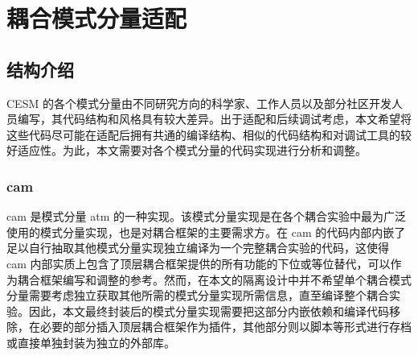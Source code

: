 \chapter{耦合模式分量适配}
\label{cha:refactor}

\section{结构介绍}

CESM 的各个模式分量由不同研究方向的科学家、工作人员以及部分社区开发人员编写，其代码结构和风格具有较大差异。出于适配和后续调试考虑，本文希望将这些代码尽可能在适配后拥有共通的编译结构、相似的代码结构和对调试工具的较好适应性。为此，本文需要对各个模式分量的代码实现进行分析和调整。

\subsection{cam}

cam \cite{CAMdoc}是模式分量 atm 的一种实现。该模式分量实现是在各个耦合实验中最为广泛使用的模式分量实现，也是对耦合框架的主要需求方。在 cam 的代码内部内嵌了足以自行抽取其他模式分量实现独立编译为一个完整耦合实验的代码，这使得 cam 内部实质上包含了顶层耦合框架提供的所有功能的下位或等位替代，可以作为耦合框架编写和调整的参考。然而，在本文的隔离设计中并不希望单个耦合模式分量需要考虑独立获取其他所需的模式分量实现所需信息，直至编译整个耦合实验。因此，本文最终封装后的模式分量实现需要把这部分内嵌依赖和编译代码移除，在必要的部分插入顶层耦合框架作为插件，其他部分则以脚本等形式进行存档或直接单独封装为独立的外部库。

